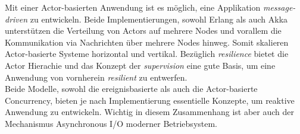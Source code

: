 Mit einer Actor-basierten Anwendung ist es möglich, eine Applikation \textit{message-driven} zu entwickeln. Beide Implementierungen, sowohl Erlang als auch Akka unterstützen die Verteilung von Actors auf mehrere Nodes und vorallem die Kommunikation via Nachrichten über mehrere Nodes hinweg. Somit skalieren Actor-basierte Systeme horizontal und vertikal. Bezüglich \textit{resilience} bietet die Actor Hierachie und das Konzept der \textit{supervision} eine gute Basis, um eine Anwendung von vornherein \textit{resilient} zu entwerfen.\\

Beide Modelle, sowohl die ereignisbasierte als auch die Actor-basierte Concurrency, bieten je nach Implementierung essentielle Konzepte, um reaktive Anwendung zu entwickeln. Wichtig in diesem Zusammenhang ist aber auch der Mechanismus Asynchronous I/O moderner Betriebsystem.
